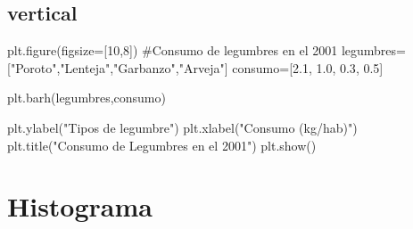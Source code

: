 \documentclass[
  jou,
  floatsintext,
  longtable,
  a4paper,
  nolmodern,
  notxfonts,
  notimes,
  colorlinks=true,linkcolor=blue,citecolor=blue,urlcolor=blue]{apa7}
\newenvironment{Shaded}{\begin{snugshade}}{\end{snugshade}}
\newcommand{\CommentTok}[1]{\textcolor[rgb]{0.37,0.37,0.37}{#1}}
\newcommand{\DecValTok}[1]{\textcolor[rgb]{0.68,0.00,0.00}{#1}}
\newcommand{\FloatTok}[1]{\textcolor[rgb]{0.68,0.00,0.00}{#1}}
\newcommand{\NormalTok}[1]{\textcolor[rgb]{0.00,0.23,0.31}{#1}}
\newcommand{\OperatorTok}[1]{\textcolor[rgb]{0.37,0.37,0.37}{#1}}
\newcommand{\StringTok}[1]{\textcolor[rgb]{0.13,0.47,0.30}{#1}}
\begin{document}
\subsection{vertical}\label{vertical}

\begin{Shaded}
\begin{Highlighting}[]
\NormalTok{plt.figure(figsize}\OperatorTok{=}\NormalTok{[}\DecValTok{10}\NormalTok{,}\DecValTok{8}\NormalTok{])}
\CommentTok{\#Consumo de legumbres en el 2001}
\NormalTok{legumbres}\OperatorTok{=}\NormalTok{[}\StringTok{"Poroto"}\NormalTok{,}\StringTok{"Lenteja"}\NormalTok{,}\StringTok{"Garbanzo"}\NormalTok{,}\StringTok{"Arveja"}\NormalTok{]}
\NormalTok{consumo}\OperatorTok{=}\NormalTok{[}\FloatTok{2.1}\NormalTok{, }\FloatTok{1.0}\NormalTok{, }\FloatTok{0.3}\NormalTok{, }\FloatTok{0.5}\NormalTok{]}

\NormalTok{plt.barh(legumbres,consumo)}

\NormalTok{plt.ylabel(}\StringTok{"Tipos de legumbre"}\NormalTok{)}
\NormalTok{plt.xlabel(}\StringTok{"Consumo (kg/hab)"}\NormalTok{)}
\NormalTok{plt.title(}\StringTok{"Consumo de Legumbres en el 2001"}\NormalTok{)}
\NormalTok{plt.show()}
\end{Highlighting}
\end{Shaded}

\section{Histograma}\label{histograma}
\end{document}
